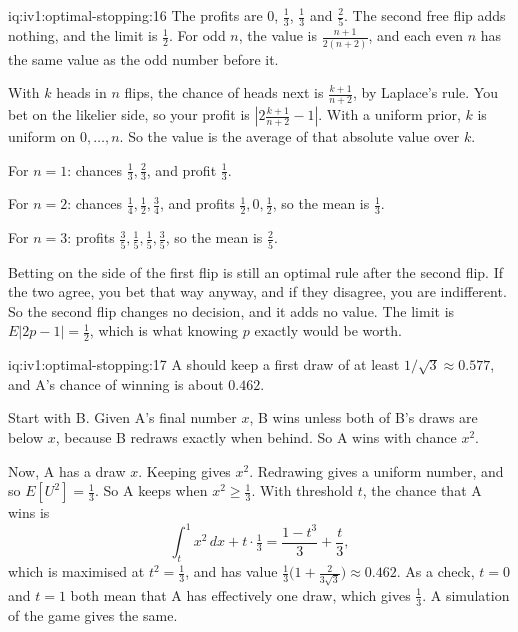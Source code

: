 \begin{solution}{iq:iv1:optimal-stopping:16}
The profits are 0, $\tfrac13$, $\tfrac13$ and $\tfrac25$. The second free flip adds nothing, and the limit is $\tfrac12$. For odd $n$, the value is $\frac{n + 1}{2(n + 2)}$, and each even $n$ has the same value as the odd number before it.

With $k$ heads in $n$ flips, the chance of heads next is $\frac{k + 1}{n + 2}$, by Laplace's rule. You bet on the likelier side, so your profit is $|2\frac{k + 1}{n + 2} - 1|$. With a uniform prior, $k$ is uniform on $0, \dots, n$. So the value is the average of that absolute value over $k$.

For $n = 1$: chances $\tfrac13, \tfrac23$, and profit $\tfrac13$.

For $n = 2$: chances $\tfrac14, \tfrac12, \tfrac34$, and profits $\tfrac12, 0, \tfrac12$, so the mean is $\tfrac13$.

For $n = 3$: profits $\tfrac35, \tfrac15, \tfrac15, \tfrac35$, so the mean is $\tfrac25$.

Betting on the side of the first flip is still an optimal rule after the second flip. If the two agree, you bet that way anyway, and if they disagree, you are indifferent. So the second flip changes no decision, and it adds no value. The limit is $E|2p - 1| = \tfrac12$, which is what knowing $p$ exactly would be worth.

\end{solution}

\begin{solution}{iq:iv1:optimal-stopping:17}
A should keep a first draw of at least $1/\sqrt{3} \approx 0.577$, and A's chance of winning is about $0.462$.

Start with B. Given A's final number $x$, B wins unless both of B's draws are below $x$, because B redraws exactly when behind. So A wins with chance $x^2$.

Now, A has a draw $x$. Keeping gives $x^2$. Redrawing gives a uniform number, and so $E[U^2] = \tfrac13$. So A keeps when $x^2 \ge \tfrac13$. With threshold $t$, the chance that A wins is
\[
\int_t^1 x^2\,dx + t \cdot \tfrac13 = \frac{1 - t^3}{3} + \frac{t}{3},
\]
which is maximised at $t^2 = \tfrac13$, and has value $\tfrac13\bigl(1 + \tfrac{2}{3\sqrt{3}}\bigr) \approx 0.462$. As a check, $t = 0$ and $t = 1$ both mean that A has effectively one draw, which gives $\tfrac13$. A simulation of the game gives the same.

\end{solution}

